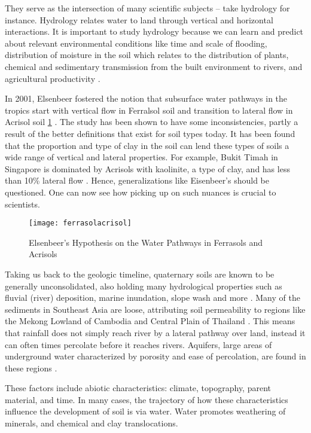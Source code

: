 They serve as the intersection of many scientific subjects -- take hydrology for instance. Hydrology relates water to land through vertical and horizontal interactions. It is important to study hydrology because we can learn and predict about relevant environmental conditions like time and scale of flooding, distribution of moisture in the soil which relates to the distribution of plants, chemical and sedimentary transmission from the built environment to rivers, and agricultural productivity \citep{chappell2010soil}. 

In 2001, Elsenbeer fostered the notion that subsurface water pathways in the tropics start with vertical flow in Ferralsol soil and transition to lateral flow in Acrisol soil \ref{fig:ferrasol_acrisol} \citep{elsenbeer2001hydrologic}. The study has been shown to have some inconsistencies, partly a result of the better definitions that exist for soil types today. It has been found that the proportion and type of clay in the soil can lend these types of soils a wide range of vertical and lateral properties. For example, Bukit Timah in Singapore is dominated by Acrisols with kaolinite, a type of clay, and has less than 10\% lateral flow \citep{chappell2005contrasting}. Hence, generalizations like Eisenbeer's should be questioned. One can now see how picking up on such nuances is crucial to scientists.


\begin{figure}
\texttt{[image: ferrasolacrisol]}
\caption{Elsenbeer's Hypothesis on the Water Pathways in Ferrasols and Acrisols}
\label{fig:ferrasol_acrisol}
\end{figure}

Taking us back to the geologic timeline, quaternary soils are known to be generally unconsolidated, also holding many hydrological properties such as fluvial (river) deposition, marine inundation, slope wash and more \citep{chappell2007runoff}. Many of the sediments in Southeast Asia are loose, attributing soil permeability to regions like the Mekong Lowland of Cambodia and Central Plain of Thailand \citep{chiem1993geo}. This means that rainfall does not simply reach river by a lateral pathway over land, instead it can often times percolate before it reaches rivers. Aquifers, large areas of underground water characterized by porosity and ease of percolation, are found in these regions \citep{struckmeier2004groundwater}. \newline

These factors include abiotic characteristics: climate, topography, parent material, and time. In many cases, the trajectory of how these characteristics influence the development of soil is via water. Water promotes weathering of minerals, and chemical and clay translocations. 


